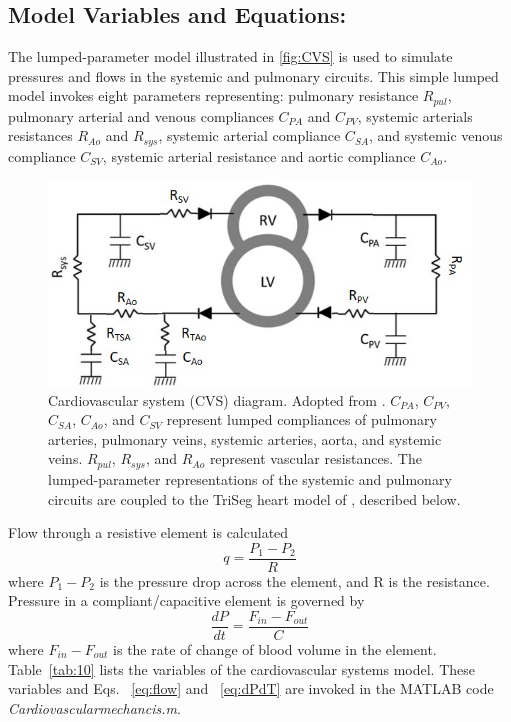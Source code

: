 \documentclass[fleqn,10pt]{physiome}
\begin{document}
\subsection{Model Variables and Equations:}

The lumped-parameter model illustrated in \autoref{fig:CVS} is used to simulate pressures and flows in the systemic and pulmonary circuits. This simple lumped model invokes eight parameters representing: pulmonary resistance $R_{pul}$, pulmonary arterial and venous compliances $C_{PA}$ and $C_{PV}$, systemic arterials resistances $R_{Ao}$ and $R_{sys}$, systemic arterial compliance $C_{SA}$, and systemic venous compliance $C_{SV}$, systemic arterial resistance and aortic compliance $C_{Ao}$. 
\begin{figure}[ht]\centering
\includegraphics[width=0.65\linewidth]{CVS.jpg}
\caption{Cardiovascular system (CVS) diagram. Adopted from \cite{Tewari2016a,Tewari2016b}. $C_{PA}$, $C_{PV}$, $C_{SA}$, $C_{Ao}$, and $C_{SV}$ represent lumped compliances of pulmonary arteries, pulmonary veins, systemic arteries, aorta, and systemic veins. $R_{pul}$, $R_{sys}$, and $R_{Ao}$ represent vascular resistances. The lumped-parameter representations of the systemic and pulmonary circuits are coupled to the TriSeg heart model of \cite{Lumens2009}, described below.}\label{fig:CVS}
\end{figure}

Flow through a resistive element is calculated
\begin{equation}\label{eq:flow}
    q =\frac{P_{1} - P_{2}}{R}
\end{equation}
where $P_{1} - P_{2}$ is the pressure drop across the element, and R is the resistance. Pressure in a compliant/capacitive element is governed by
\begin{equation}\label{eq:dPdT}
    \frac{dP}{dt} =\frac{F_{in} - F_{out}}{C} 
\end{equation}
where $F_{in} - F_{out}$ is the rate of change of blood volume in the element.
Table~\ref{tab:10} lists the variables of the cardiovascular systems model. These variables and Eqs. ~\ref{eq:flow} and ~\ref{eq:dPdT} are invoked in the MATLAB code {\em Cardiovascularmechancis.m}.
\end{document}
